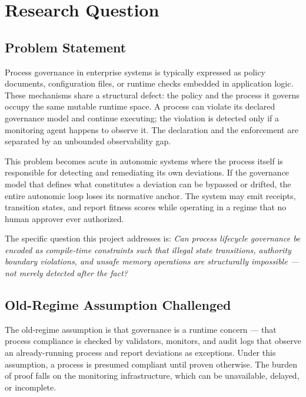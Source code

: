 
\section{Research Question}
\label{sec:blue-river-dam-question}

\subsection{Problem Statement}
\label{sec:blue-river-dam-question-problem}

Process governance in enterprise systems is typically expressed as policy
documents, configuration files, or runtime checks embedded in application
logic. These mechanisms share a structural defect: the policy and the process
it governs occupy the same mutable runtime space. A process can violate its
declared governance model and continue executing; the violation is detected
only if a monitoring agent happens to observe it. The declaration and the
enforcement are separated by an unbounded observability gap.

This problem becomes acute in autonomic systems where the process itself is
responsible for detecting and remediating its own deviations. If the governance
model that defines what constitutes a deviation can be bypassed or drifted, the
entire autonomic loop loses its normative anchor. The system may emit receipts,
transition states, and report fitness scores while operating in a regime that
no human approver ever authorized.

The specific question this project addresses is: \emph{Can process lifecycle
governance be encoded as compile-time constraints such that illegal state
transitions, authority boundary violations, and unsafe memory operations are
structurally impossible --- not merely detected after the fact?}

\subsection{Old-Regime Assumption Challenged}
\label{sec:blue-river-dam-question-old-regime}

The old-regime assumption is that governance is a runtime concern --- that
process compliance is checked by validators, monitors, and audit logs that
observe an already-running process and report deviations as exceptions. Under
this assumption, a process is presumed compliant until proven otherwise. The
burden of proof falls on the monitoring infrastructure, which can be unavailable,
delayed, or incomplete.

